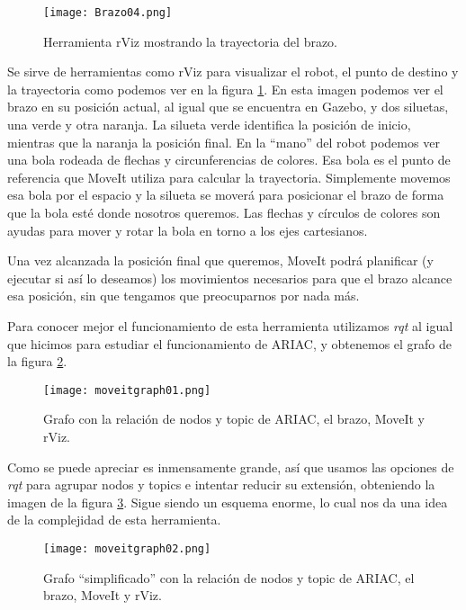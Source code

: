 \begin{figure}[h]
	\centering
	\texttt{[image: Brazo04.png]}
	\caption{Herramienta rViz mostrando la trayectoria del brazo.} \label{fig:rviz}
\end{figure}

Se sirve de herramientas como rViz para visualizar el robot, el punto de destino y la trayectoria como podemos ver en la figura \ref{fig:rviz}. En esta imagen podemos ver el brazo en su posición actual, al igual que se encuentra en Gazebo, y dos siluetas, una verde y otra naranja. La silueta verde identifica la posición de inicio, mientras que la naranja la posición final. En la “mano” del robot podemos ver una bola rodeada de flechas y circunferencias de colores. Esa bola es el punto de referencia que MoveIt utiliza para calcular la trayectoria. Simplemente movemos esa bola por el espacio y la silueta se moverá para posicionar el brazo de forma que la bola esté donde nosotros queremos. Las flechas y círculos de colores son ayudas para mover y rotar la bola en torno a los ejes cartesianos. 

Una vez alcanzada la posición final que queremos, MoveIt podrá planificar (y ejecutar si así lo deseamos) los movimientos necesarios para que el brazo alcance esa posición, sin que tengamos que preocuparnos por nada más.

Para conocer mejor el funcionamiento de esta herramienta utilizamos \textit{rqt} al igual que hicimos para estudiar el funcionamiento de ARIAC, y obtenemos el grafo de la figura \ref{fig:moveitgraph1}.

\begin{figure}[h]
	\centering
	\texttt{[image: moveitgraph01.png]}
	\caption{Grafo con la relación de nodos y topic de ARIAC, el brazo, MoveIt y rViz.} \label{fig:moveitgraph1}
\end{figure}

Como se puede apreciar es inmensamente grande, así que usamos las opciones de \textit{rqt} para agrupar nodos y topics e intentar reducir su extensión, obteniendo la imagen de la figura \ref{fig:moveitgraph2}. Sigue siendo un esquema enorme, lo cual nos da una idea de la complejidad de esta herramienta.

\begin{figure}[h]
	\centering
	\texttt{[image: moveitgraph02.png]}
	\caption{Grafo “simplificado” con la relación de nodos y topic de ARIAC, el brazo, MoveIt y rViz.} \label{fig:moveitgraph2}
\end{figure}

